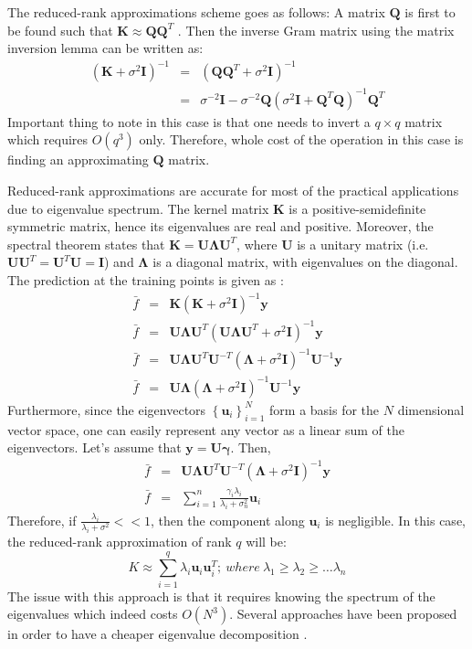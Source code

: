 \documentclass{article}
\begin{document}
The reduced-rank approximations scheme goes as follows: A matrix $\mathbf{Q}$ is first to be found such that $\mathbf{K} \approx \mathbf{Q}\mathbf{Q}^T$ . Then the inverse Gram matrix using the matrix inversion lemma can be written as:
\begin{eqnarray}
(\mathbf{K}+\sigma^2\mathbf{I})^{-1}&=&(\mathbf{Q}\mathbf{Q}^T+\sigma^2\mathbf{I})^{-1} \nonumber \\
&=&\sigma^{-2}\mathbf{I}-\sigma^{-2}\mathbf{Q}(\sigma^2\mathbf{I}+\mathbf{Q}^T\mathbf{Q})^{-1}\mathbf{Q}^T
\end{eqnarray}
Important thing to note in this case is that one needs to invert a $q \times q$ matrix which requires $O(q^3)$ only. Therefore, whole cost of the operation in this case is finding an approximating $\mathbf{Q}$ matrix.

Reduced-rank approximations are accurate for most of the practical applications due to eigenvalue spectrum. The kernel matrix $\mathbf{K}$ is a positive-semidefinite symmetric matrix, hence its eigenvalues are real and positive. Moreover, the spectral theorem states that $\mathbf{K}=\mathbf{U\Lambda U}^T$, where $\mathbf{U}$ is a unitary matrix (i.e. $\mathbf{U}\mathbf{U}^T=\mathbf{U}^T\mathbf{U}=\mathbf{I}$) and $\mathbf{\Lambda}$ is a diagonal matrix, with eigenvalues on the diagonal. The prediction at the training points is given as :
\begin{eqnarray}
\bar{f}&=&\mathbf{K}(\mathbf{K}+\sigma^2\mathbf{I})^{-1}\mathbf{y} \nonumber \\
\bar{f}&=&\mathbf{U\Lambda U}^T(\mathbf{U\Lambda U}^T+\sigma^2\mathbf{I})^{-1}\mathbf{y} \nonumber \\
\bar{f}&=& \mathbf{U\Lambda U}^T\mathbf{U}^{-T}(\mathbf{\Lambda}+\sigma^2\mathbf{I})^{-1}\mathbf{U}^{-1}\mathbf{y} \nonumber \\
\bar{f}&=& \mathbf{U\Lambda}(\mathbf{\Lambda}+\sigma^2\mathbf{I})^{-1}\mathbf{U}^{-1}\mathbf{y} 
\end{eqnarray}
Furthermore, since the eigenvectors $\left\{\mathbf{u}_i\right\}_{i=1}^N$ form a basis for the $N$ dimensional vector space, one can easily represent any vector as a linear sum of the eigenvectors. Let's assume that $\mathbf{y}=\mathbf{U}\mathbf{\gamma}$. Then,
\begin{eqnarray}
\bar{f}&=& \mathbf{U\Lambda U}^T\mathbf{U}^{-T}(\mathbf{\Lambda}+\sigma^2\mathbf{I})^{-1}\mathbf{y}  \nonumber \\
\bar{f}&=&\sum_{i=1}^n\frac{\gamma_i\lambda_i}{\lambda_i+\sigma_n^2}\mathbf{u}_i
\end{eqnarray}
Therefore, if $\frac{\lambda_i}{\lambda_i+\sigma^2}<<1$, then the component along $\mathbf{u}_i$ is negligible. In this case, the reduced-rank approximation of rank $q$ will be:
\begin{equation}
K\approx \sum_{i=1}^q \lambda_i \mathbf{u}_i \mathbf{u}_i^T; \> where \> \lambda_1\geq \lambda_2 \geq \dots \lambda_n
\end{equation}
The issue with this approach is that it requires knowing the spectrum of the eigenvalues which indeed costs $O(N^3)$.  Several approaches have been proposed in order to have a cheaper eigenvalue decomposition \cite{rasmussen06}. 
\end{document}
